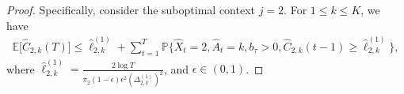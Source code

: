 \begin{proof}
Specifically, consider the suboptimal context $j =  2$.
For  $1 \leq k \leq K$, we have
\begin{align}
\mathbb{E}\big[\hat{C}_{2,k}(T)\big] \leq \hat{\ell}_{2,k}^{(1)}+ \sum_{t = 1}^T \mathbb{P}\{\hat{X}_t = 2, \hat{A}_t = k, b_{\tau} > 0, \hat{C}_{2,k}(t-1) \geq \hat{\ell}_{2,k}^{(1)}\}, \nonumber
\end{align}
where $\hat{\ell}_{2,k}^{(1)} = \frac{2\log T}{\pi_2(1-\epsilon)\epsilon^2(\Delta_{2,k}^{(1)})^2}$, and $\epsilon  \in (0,1)$.


\end{proof}
